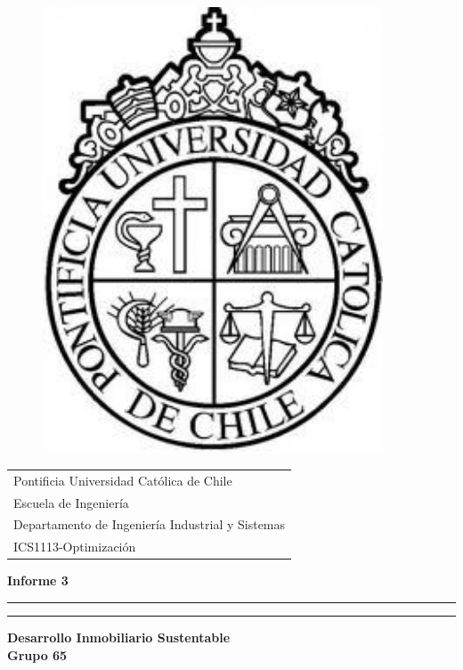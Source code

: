 \documentclass[letterpaper]{article}
\begin{document}
\nocite{*}

\begin{minipage}[t]{.13\textwidth}
	\vspace{-0.25in}
	\begin{figure}[H]
	\includegraphics[width=0.90\textwidth]{LogoUC.jpg}
	\end{figure}
\end{minipage}
\hfill
\begin{minipage}[t]{.85\textwidth}
    \vspace{0pt}
    \begin{flushleft}
      \begin{tabular}{l}
	{\sc Pontificia Universidad Cat\'olica de Chile}\\
  	{\sc Escuela de Ingenier\'ia}\\
  	{\sc Departamento de Ingenier\'ia Industrial y Sistemas}\\
 	 {\sc ICS1113-Optimizaci\'on}
 \end{tabular}
	\end{flushleft}
\end{minipage}
\vspace{0pt}
\hfill
\vspace*{6cm}
\begin{center}{}
\vspace*{2mm}
{\Huge\bf Informe 3}\\
\vspace*{4mm}
\hrule\vspace*{1pt}\hrule
\vspace*{4mm}
{\LARGE\bf Desarrollo Inmobiliario Sustentable}\\
\vspace*{4mm}
{\huge\bf Grupo 65 }\\
\vspace*{1mm}
\end{center}
\end{document}

